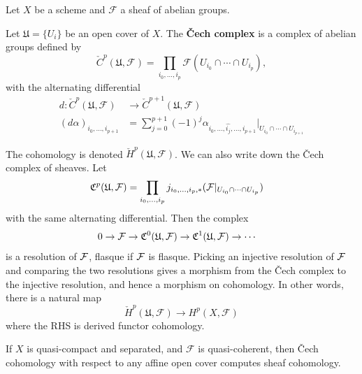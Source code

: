 \documentclass[12pt]{article}
\begin{document}
Let $X$ be a scheme and $\mathcal F$ a sheaf of abelian groups.

\begin{definition}
    Let $\mathfrak U = \{U_i\}$ be an open cover of $X$. The \textbf{Čech complex} is a complex of abelian groups defined by
    \[
        \check C^p(\mathfrak U,\mathcal F)
        = \prod_{i_0,\dots,i_p} \mathcal F(U_{i_0}\cap\cdots\cap U_{i_p}),
    \]
    with the alternating differential
    \begin{align*}
        d:\check C^p(\mathfrak U,\mathcal F) & \to \check C^{p+1}(\mathfrak U,\mathcal F)                                                                    \\
        (d\alpha)_{i_0,\dots,i_{p+1}}        & = \sum_{j=0}^{p+1} (-1)^j \alpha_{i_0,\dots,\widehat{i_j},\dots,i_{p+1}}|_{U_{i_0}\cap\cdots\cap U_{i_{p+1}}}
    \end{align*}
\end{definition}
The cohomology is denoted $\check H^p(\mathfrak U,\mathcal F)$. We can also write down the Čech complex of sheaves. Let \begin{align*}
    \mathfrak{C}^p(\mathfrak U,\mathcal F) & = \prod_{i_0,\dots,i_p} j_{i_0,\dots,i_p,*}(\mathcal F|_{U_{i_0}\cap\cdots\cap U_{i_p}})
\end{align*} with the same alternating differential. Then the complex \begin{align*}
    0 \to {\mathcal{F}} & \to \mathfrak{C}^0(\mathfrak U,\mathcal F) \to \mathfrak{C}^1(\mathfrak U,\mathcal F) \to \cdots
\end{align*} is a resolution of ${\mathcal{F}}$, flasque if ${\mathcal{F}}$ is flasque. Picking an injective resolution of ${\mathcal{F}}$ and comparing the two resolutions gives a morphism from the Čech complex to the injective resolution, and hence a morphism on cohomology. In other words, there is a natural map
\[
    \check H^p(\mathfrak U,\mathcal F) \to H^p(X,\mathcal F)
\]
where the RHS is derived functor cohomology.

\begin{theorem}
    If $X$ is quasi-compact and separated, and $\mathcal F$ is quasi-coherent, then Čech cohomology with respect to any affine open cover computes sheaf cohomology.
\end{theorem}
\end{document}
